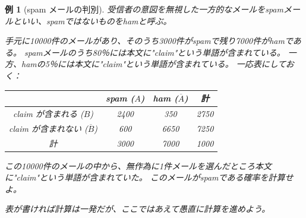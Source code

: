 \documentclass[12pt]{ltjsarticle}\usepackage{ifthen}\newcounter{enlarge}\setcounter{enlarge}{1}
\newtheorem{eg}{例}
\begin{document}
\begin{eg}[spam メールの判別]
  受信者の意図を無視した一方的なメールをspamメールといい、spamではないものをhamと呼ぶ。

  手元に10000件のメールがあり、そのうち3000件がspamで残り7000件がhamである。
  spamメールのうち80％には本文に"claim"という単語が含まれている。
  一方、hamの5％には本文に"claim"という単語が含まれている。
  一応表にしておく：

  \begin{center}
  \begin{tabular}{c|cc|c} \hline
    & spam  ($A$) & ham ($\overline{A}$) & 計 \\ \hline
    claim が含まれる ($B$) & 2400 & 350 & 2750 \\
    claim が含まれない ($\overline{B}$) & 600 & 6650 & 7250 \\ \hline
    計 & 3000 & 7000 & 1000 \\ \hline
  \end{tabular}
  \end{center}

  この10000件のメールの中から、無作為に1件メールを選んだところ本文に"claim"という単語が含まれていた。
  このメールがspamである確率を計算せよ。

  表が書ければ計算は一発だが、ここではあえて愚直に計算を進めよう。
  \end{eg}
\end{document}
